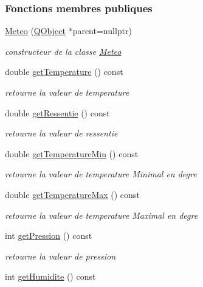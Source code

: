 \subsubsection*{Fonctions membres publiques}
\begin{DoxyCompactItemize}
\item 
\hyperlink{class_meteo_aa7dab03da06a05dce302c154ad9aec53}{Meteo} (\hyperlink{class_q_object}{Q\+Object} $\ast$parent=nullptr)
\begin{DoxyCompactList}\small\item\em constructeur de la classe \hyperlink{class_meteo}{Meteo} \end{DoxyCompactList}\item 
double \hyperlink{class_meteo_ad0a7466f4371df14623fd03fa0bab8dd}{get\+Temperature} () const 
\begin{DoxyCompactList}\small\item\em retourne la valeur de temperature \end{DoxyCompactList}\item 
double \hyperlink{class_meteo_a7bcbc6280fb91ff28436e84f7d8765e7}{get\+Ressentie} () const 
\begin{DoxyCompactList}\small\item\em retourne la valeur de ressentie \end{DoxyCompactList}\item 
double \hyperlink{class_meteo_a0cef4ff7ae16cfcd820d164d1c5334c4}{get\+Temperature\+Min} () const 
\begin{DoxyCompactList}\small\item\em retourne la valeur de temperature Minimal en degre \end{DoxyCompactList}\item 
double \hyperlink{class_meteo_a114aadb20b0b56c1fe8a6fc2dd19c02b}{get\+Temperature\+Max} () const 
\begin{DoxyCompactList}\small\item\em retourne la valeur de temperature Maximal en degre \end{DoxyCompactList}\item 
int \hyperlink{class_meteo_a2a4cd85d63157f6b682d37f9c19d1683}{get\+Pression} () const 
\begin{DoxyCompactList}\small\item\em retourne la valeur de pression \end{DoxyCompactList}\item 
int \hyperlink{class_meteo_a336cfea55c062ebe45fbc7d1a48aaaa1}{get\+Humidite} () const 

\end{DoxyCompactItemize}
